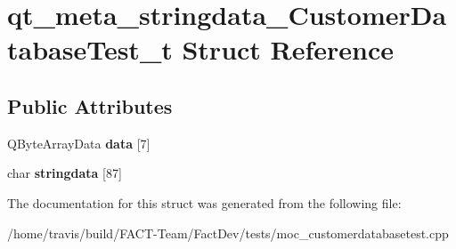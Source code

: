 \hypertarget{structqt__meta__stringdata__CustomerDatabaseTest__t}{\section{qt\-\_\-meta\-\_\-stringdata\-\_\-\-Customer\-Database\-Test\-\_\-t Struct Reference}
\label{structqt__meta__stringdata__CustomerDatabaseTest__t}
}
\subsection*{Public Attributes}
\begin{DoxyCompactItemize}
\item 
\hypertarget{structqt__meta__stringdata__CustomerDatabaseTest__t_a7bae51a669e7da459da143cb33361485}{Q\-Byte\-Array\-Data {\bfseries data} \mbox{[}7\mbox{]}}\label{structqt__meta__stringdata__CustomerDatabaseTest__t_a7bae51a669e7da459da143cb33361485}

\item 
\hypertarget{structqt__meta__stringdata__CustomerDatabaseTest__t_af8743a1b413289834ed5f1820baaaa64}{char {\bfseries stringdata} \mbox{[}87\mbox{]}}\label{structqt__meta__stringdata__CustomerDatabaseTest__t_af8743a1b413289834ed5f1820baaaa64}

\end{DoxyCompactItemize}


The documentation for this struct was generated from the following file\-:\begin{DoxyCompactItemize}
\item 
/home/travis/build/\-F\-A\-C\-T-\/\-Team/\-Fact\-Dev/tests/moc\-\_\-customerdatabasetest.\-cpp\end{DoxyCompactItemize}

